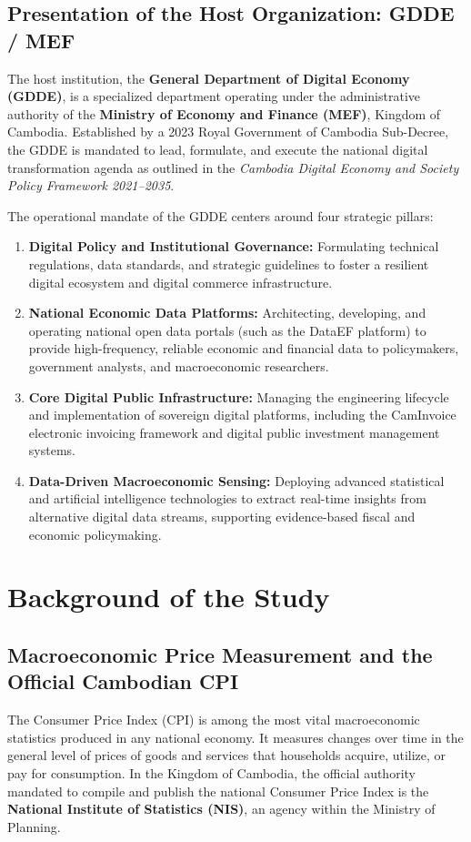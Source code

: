 \subsection{Presentation of the Host Organization: GDDE / MEF}
\hs The host institution, the \textbf{General Department of Digital Economy (GDDE)}, is a specialized department operating under the administrative authority of the \textbf{Ministry of Economy and Finance (MEF)}, Kingdom of Cambodia. Established by a 2023 Royal Government of Cambodia Sub-Decree, the GDDE is mandated to lead, formulate, and execute the national digital transformation agenda as outlined in the \textit{Cambodia Digital Economy and Society Policy Framework 2021--2035}.

\hs The operational mandate of the GDDE centers around four strategic pillars:
\begin{enumerate}
    \item \textbf{Digital Policy and Institutional Governance:} Formulating technical regulations, data standards, and strategic guidelines to foster a resilient digital ecosystem and digital commerce infrastructure.
    \item \textbf{National Economic Data Platforms:} Architecting, developing, and operating national open data portals (such as the DataEF platform) to provide high-frequency, reliable economic and financial data to policymakers, government analysts, and macroeconomic researchers.
    \item \textbf{Core Digital Public Infrastructure:} Managing the engineering lifecycle and implementation of sovereign digital platforms, including the CamInvoice electronic invoicing framework and digital public investment management systems.
    \item \textbf{Data-Driven Macroeconomic Sensing:} Deploying advanced statistical and artificial intelligence technologies to extract real-time insights from alternative digital data streams, supporting evidence-based fiscal and economic policymaking.
\end{enumerate}

\section{Background of the Study}

\subsection{Macroeconomic Price Measurement and the Official Cambodian CPI}
\hs The Consumer Price Index (CPI) is among the most vital macroeconomic statistics produced in any national economy. It measures changes over time in the general level of prices of goods and services that households acquire, utilize, or pay for consumption. In the Kingdom of Cambodia, the official authority mandated to compile and publish the national Consumer Price Index is the \textbf{National Institute of Statistics (NIS)}, an agency within the Ministry of Planning.

